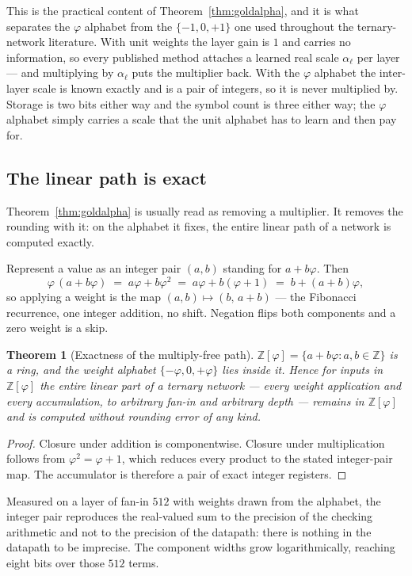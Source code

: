 \documentclass[11pt]{article}
\newtheorem{theorem}{Theorem}
\theoremstyle{definition}
\begin{document}
This is the practical content of Theorem~\ref{thm:goldalpha}, and it is what
separates the $\varphi$ alphabet from the $\{-1,0,+1\}$ one used throughout the
ternary-network literature. With unit weights the layer gain is $1$ and carries no
information, so every published method attaches a learned real scale $\alpha_\ell$
per layer --- and multiplying by $\alpha_\ell$ puts the multiplier back. With the
$\varphi$ alphabet the inter-layer scale is known exactly and is a pair of
integers, so it is never multiplied by. Storage is two bits either way and the
symbol count is three either way; the $\varphi$ alphabet simply carries a scale
that the unit alphabet has to learn and then pay for.


\subsection{The linear path is exact}
\label{sec:exact}

Theorem~\ref{thm:goldalpha} is usually read as removing a multiplier. It removes
the rounding with it: on the alphabet it fixes, the entire linear path of a
network is computed exactly.

Represent a value as an integer pair $(a,b)$ standing for $a + b\varphi$. Then
\[
  \varphi\,(a + b\varphi) \;=\; a\varphi + b\varphi^{2} \;=\; a\varphi + b(\varphi+1)
  \;=\; b + (a+b)\varphi ,
\]
so applying a weight is the map $(a,b) \mapsto (b,\,a+b)$ --- the Fibonacci
recurrence, one integer addition, no shift. Negation flips both components and a
zero weight is a skip.

\begin{theorem}[Exactness of the multiply-free path]
\label{thm:exact}
$\mathbb{Z}[\varphi] = \{a + b\varphi : a,b \in \mathbb{Z}\}$ is a ring, and the
weight alphabet $\{-\varphi,0,+\varphi\}$ lies inside it. Hence for inputs in
$\mathbb{Z}[\varphi]$ the entire linear part of a ternary network --- every
weight application and every accumulation, to arbitrary fan-in and arbitrary
depth --- remains in $\mathbb{Z}[\varphi]$ and is computed \emph{without
rounding error of any kind}.
\end{theorem}
\begin{proof}
Closure under addition is componentwise. Closure under multiplication follows
from $\varphi^2 = \varphi + 1$, which reduces every product to the stated
integer-pair map. The accumulator is therefore a pair of exact integer registers.
\end{proof}

Measured on a layer of fan-in $512$ with weights drawn from the alphabet, the
integer pair reproduces the real-valued sum to the precision of the checking
arithmetic and not to the precision of the datapath: there is nothing in the
datapath to be imprecise. The component widths grow logarithmically, reaching
eight bits over those $512$ terms.
\end{document}
